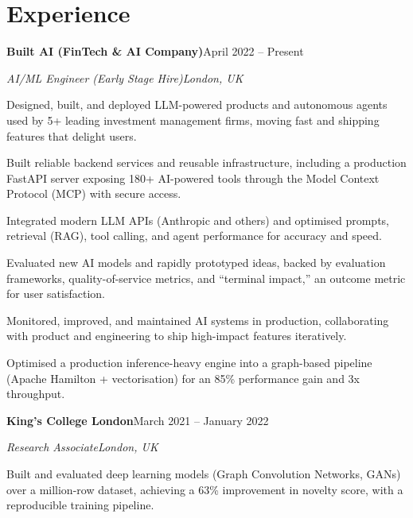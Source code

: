 \documentclass[10pt,a4paper]{article}
\newcommand{\entry}[4]{%
  {\color{company}\bfseries #1}\hfill {\color{muted}#2}\par
  \vspace{1pt}
  {\itshape #3}\hfill {\color{muted}\itshape #4}\par
  \vspace{3pt}%
}
\begin{document}
\section{Experience}
\entry{Built AI (FinTech \& AI Company)}{April 2022 -- Present}{AI/ML Engineer (Early Stage Hire)}{London, UK}
\begin{tight}
  \item Designed, built, and deployed LLM-powered products and autonomous agents used by 5+ leading investment management firms, moving fast and shipping features that delight users.
  \item Built reliable backend services and reusable infrastructure, including a production FastAPI server exposing 180+ AI-powered tools through the Model Context Protocol (MCP) with secure access.
  \item Integrated modern LLM APIs (Anthropic and others) and optimised prompts, retrieval (RAG), tool calling, and agent performance for accuracy and speed.
  \item Evaluated new AI models and rapidly prototyped ideas, backed by evaluation frameworks, quality-of-service metrics, and ``terminal impact,'' an outcome metric for user satisfaction.
  \item Monitored, improved, and maintained AI systems in production, collaborating with product and engineering to ship high-impact features iteratively.
  \item Optimised a production inference-heavy engine into a graph-based pipeline (Apache Hamilton + vectorisation) for an 85\% performance gain and 3x throughput.
\end{tight}

\entry{King's College London}{March 2021 -- January 2022}{Research Associate}{London, UK}
\begin{tight}
  \item Built and evaluated deep learning models (Graph Convolution Networks, GANs) over a million-row dataset, achieving a 63\% improvement in novelty score, with a reproducible training pipeline.
\end{tight}

\end{document}
